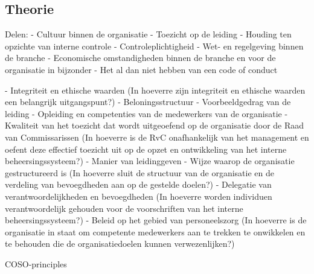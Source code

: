 
\subsection{Theorie}


Delen:
- Cultuur binnen de organisatie
- Toezicht op de leiding
- Houding ten opzichte van interne controle
- Controleplichtigheid
- Wet- en regelgeving binnen de branche
- Economische omstandigheden binnen de branche en voor de organisatie in bijzonder
- Het al dan niet hebben van een code of conduct
\citet{bivpraktijk}

- Integriteit en ethische waarden
(In hoeverre zijn integriteit en ethische waarden een belangrijk uitgangspunt?)
- Beloningsstructuur
- Voorbeeldgedrag van de leiding
- Opleiding en competenties van de medewerkers van de organisatie
- Kwaliteit van het toezicht dat wordt uitgeoefend op de organisatie door de Raad van Commissarissen
(In hoeverre is de RvC onafhankelijk van het management en oefent deze effectief toezicht uit op de opzet en ontwikkeling van het interne beheersingssysteem?)
- Manier van leidinggeven
- Wijze waarop de organisatie gestructureerd is
(In hoeverre sluit de structuur van de organisatie en de verdeling van bevoegdheden aan op de gestelde doelen?)
- Delegatie van verantwoordelijkheden en bevoegdheden
(In hoeverre worden individuen verantwoordelijk gehouden voor de voorschriften van het interne beheersingssysteem?)
- Beleid op het gebied van personeelszorg 
(In hoeverre is de organisatie in staat om competente medewerkers aan te trekken te onwikkelen en te behouden die de organisatiedoelen kunnen verwezenlijken?)
\citet{bivperspectief}



COSO-principles

